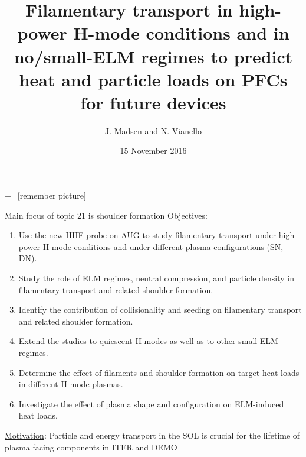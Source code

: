 \documentclass[10pt, compress]{beamer}
\title{Filamentary transport in high-power H-mode conditions and in
  no/small-ELM regimes to predict heat and particle loads on PFCs for
  future devices}
\date{15 November 2016}
\author[Topic 21. J. Madsen and N.Vianello]{J. Madsen and N. Vianello}
\begin{document}
+=[remember picture]
\maketitle

\begin{frame}{Main focus of topic 21 is shoulder formation}
\vspace{-1cm}
Objectives:
\begin{enumerate}
\item Use the new HHF probe on AUG to study filamentary transport under
high-power H-mode conditions and under different plasma configurations (SN,
DN).
\item Study the role of ELM regimes, neutral compression, and particle density in
filamentary transport and related shoulder formation.
\item Identify the contribution of collisionality and seeding on filamentary transport
and related shoulder formation.
\item Extend the studies to quiescent H-modes as well as to other small-ELM regimes.
\item Determine the effect of filaments and shoulder formation on target heat loads
in different H-mode plasmas.
\item Investigate the effect of plasma shape and configuration on ELM-induced heat
loads.
\end{enumerate}
\underline{Motivation}: Particle and energy transport in the SOL is crucial for the lifetime of plasma facing components in ITER and DEMO
\end{frame}
\end{document}
